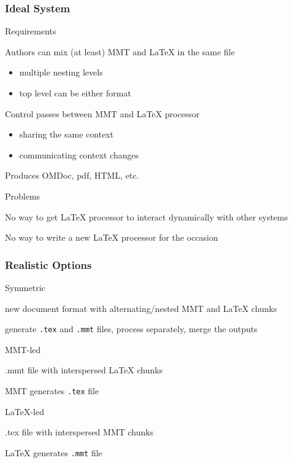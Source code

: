 \begin{frame}\frametitle{Ideal System}
\begin{blockitems}{Requirements}
\item Authors can mix (at least) MMT and LaTeX in the same file
 \begin{itemize}
 \item multiple nesting levels
 \item top level can be either format
 \end{itemize}
\item Control passes between MMT and LaTeX processor
 \begin{itemize}
 \item sharing the same context
 \item communicating context changes
 \end{itemize}
\item Produces OMDoc, pdf, HTML, etc.
\end{blockitems}

\begin{blockitems}{Problems}
\item No way to get LaTeX processor to interact dynamically with other systems
\item No way to write a new LaTeX processor for the occasion
\end{blockitems}
\end{frame}

\begin{frame}\frametitle{Realistic Options}
\begin{blockitems}{Symmetric}
\item new document format with alternating/nested MMT and LaTeX chunks
\item generate \texttt{.tex} and \texttt{.mmt} files, process separately, merge the outputs
\end{blockitems}

\begin{blockitems}{MMT-led}
\item .mmt file with interspersed LaTeX chunks
\item MMT generates \texttt{.tex} file
\end{blockitems}

\begin{blockitems}{LaTeX-led}
\item .tex file with interspersed MMT chunks
\item LaTeX generates \texttt{.mmt} file
\end{blockitems}
\end{frame}

